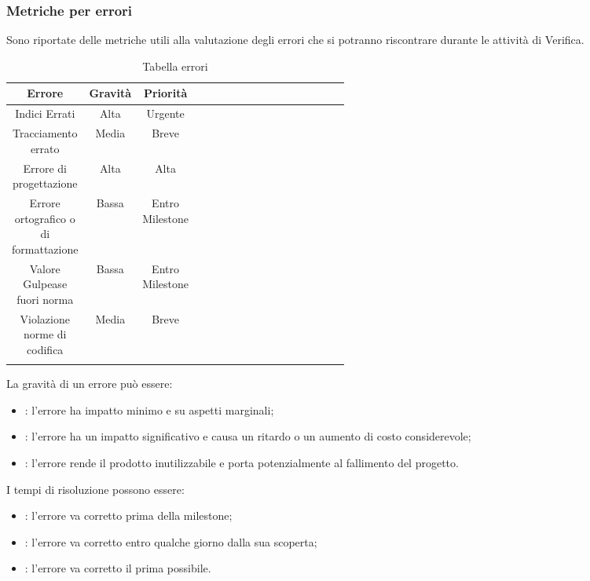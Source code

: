 \subsubsection{Metriche per errori}
Sono riportate delle metriche utili alla valutazione degli errori che si potranno riscontrare durante le attività di Verifica.
\begin{center}
\begin{longtable}{|c|c|c|p{0.5\linewidth}|}
\toprule
\textbf{Errore} & \textbf{Gravità} & \textbf{Priorità} \\

\midrule
Indici Errati & Alta & Urgente\\
\midrule
Tracciamento errato & Media & Breve\\
\midrule
Errore di progettazione & Alta & Alta\\
\midrule
Errore ortografico o di formattazione & Bassa & Entro Milestone\\
\midrule
Valore Gulpease fuori norma & Bassa & Entro Milestone\\
\midrule
Violazione norme di codifica & Media & Breve\\

\bottomrule
\caption{Tabella errori}
\label{tab:changelog}
\end{longtable}
\end{center}

La gravità di un errore può essere:

\begin{itemize}
\item {}: l'errore ha impatto minimo e su aspetti marginali;
\item {}: l'errore ha un impatto significativo e causa un ritardo o un aumento di costo considerevole;
\item {}: l'errore rende il prodotto inutilizzabile e porta potenzialmente al fallimento del progetto.
\end{itemize}

I tempi di risoluzione possono essere:
\begin{itemize}
\item {}: l'errore va corretto prima della milestone;
\item {}: l'errore va corretto entro qualche giorno dalla sua scoperta;
\item {}: l'errore va corretto il prima possibile.
\end{itemize}


